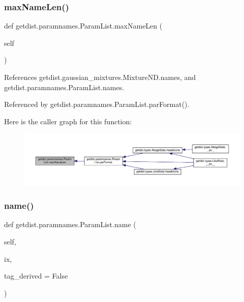 \subsubsection{\texorpdfstring{max\+Name\+Len()}{maxNameLen()}}
{\footnotesize\ttfamily def getdist.\+paramnames.\+Param\+List.\+max\+Name\+Len (\begin{DoxyParamCaption}\item[{}]{self }\end{DoxyParamCaption})}



References getdist.\+gaussian\+\_\+mixtures.\+Mixture\+N\+D.\+names, and getdist.\+paramnames.\+Param\+List.\+names.



Referenced by getdist.\+paramnames.\+Param\+List.\+par\+Format().

Here is the caller graph for this function\+:
\nopagebreak
\begin{figure}[H]
\begin{center}
\leavevmode
\includegraphics[width=350pt]{classgetdist_1_1paramnames_1_1ParamList_ad65897f1aba22e11c87438a840db6683_icgraph}
\end{center}
\end{figure}
\mbox{\label{classgetdist_1_1paramnames_1_1ParamList_aea1705e69ca01b937e118b44e468510a}} 
\subsubsection{\texorpdfstring{name()}{name()}}
{\footnotesize\ttfamily def getdist.\+paramnames.\+Param\+List.\+name (\begin{DoxyParamCaption}\item[{}]{self,  }\item[{}]{ix,  }\item[{}]{tag\+\_\+derived = {\ttfamily False} }\end{DoxyParamCaption})}



